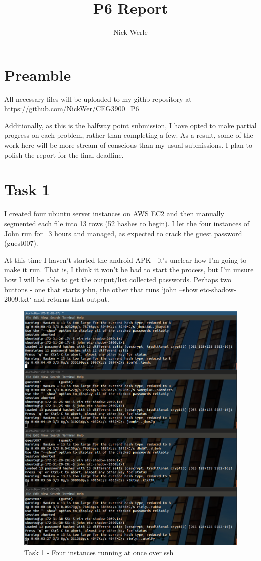 \documentclass{article}
\title{P6 Report}
\author{Nick Werle}
\begin{document}
\maketitle
\section{Preamble}
All necessary files will be uploaded to my githb repository at \url{https://github.com/NickWer/CEG3900_P6}

Additionally, as this is the halfway point submission, I have opted to make partial progress on each problem, rather than completing a few.
As a result, some of the work here will be more stream-of-conscious than my usual submissions. I plan to polish the report for the final deadline.

\section{Task 1}
I created four ubuntu server instances on AWS EC2 and then manually segmented each file into 13 rows (52 hashes to begin).
I let the four instances of John run for ~3 hours and managed, as expected to crack the guest password (guest007).

At this time I haven't started the android APK - it's unclear how I'm going to make it run.
That is, I think it won't be bad to start the process, but I'm unsure how I will be able to get the output/list collected passwords.
Perhaps two buttons - one that starts john, the other that runs `john --show etc-shadow-2009.txt` and returns that output.

	\begin{figure}[ht]
        \centerline{
            \includegraphics[width=7.5in]{img/t1s1.png}
        }
		\centering
		\caption{Task 1 - Four instances running at once over ssh}
	\end{figure}
\end{document}
